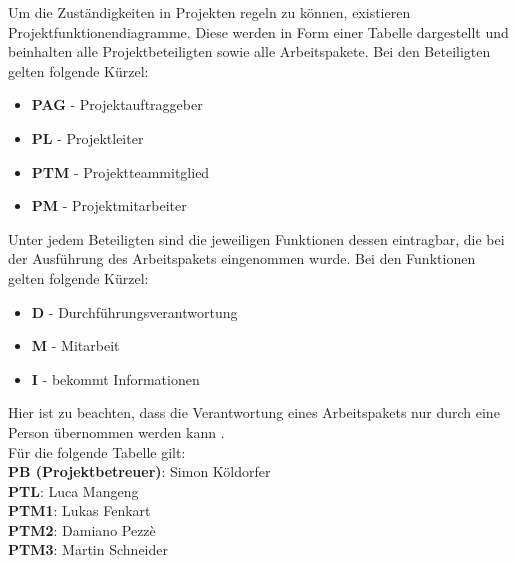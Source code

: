 Um die Zuständigkeiten in Projekten regeln zu können, existieren Projektfunktionendiagramme. Diese werden in Form einer Tabelle dargestellt und beinhalten alle Projektbeteiligten sowie alle Arbeitspakete. Bei den Beteiligten gelten folgende Kürzel:
\begin{itemize}
	\item \textbf{PAG} - Projektauftraggeber
	\item \textbf{PL} - Projektleiter
	\item \textbf{PTM} - Projektteammitglied
	\item \textbf{PM} - Projektmitarbeiter
\end{itemize}
Unter jedem Beteiligten sind die jeweiligen Funktionen dessen eintragbar, die bei der Ausführung des Arbeitspakets eingenommen wurde.
Bei den Funktionen gelten folgende Kürzel:
\begin{itemize}
	\item \textbf{D} - Durchführungsverantwortung
	\item \textbf{M} - Mitarbeit
	\item \textbf{I} - bekommt Informationen
\end{itemize}
Hier ist zu beachten, dass die Verantwortung eines Arbeitspakets nur durch eine Person übernommen werden kann \cite{prezi:o.J.}.
\\Für die folgende Tabelle gilt:
\\\textbf{PB (Projektbetreuer)}: Simon Köldorfer \\\textbf{PTL}: Luca Mangeng \\\textbf{PTM1}: Lukas Fenkart\\\textbf{PTM2}: Damiano Pezzè \\\textbf{PTM3}: Martin Schneider


